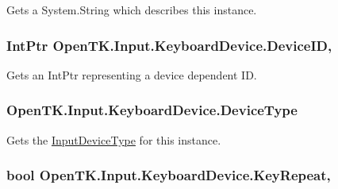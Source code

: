 Gets a System.\-String which describes this instance. 

\hypertarget{class_open_t_k_1_1_input_1_1_keyboard_device_a797379213362e109ae766992cb79b2ee}{
\subsubsection[{Device\-I\-D}]{\setlength{\rightskip}{0pt plus 5cm}Int\-Ptr Open\-T\-K.\-Input.\-Keyboard\-Device.\-Device\-I\-D\hspace{0.3cm}{\ttfamily [get]}, {\ttfamily [set]}}}\label{class_open_t_k_1_1_input_1_1_keyboard_device_a797379213362e109ae766992cb79b2ee}


Gets an Int\-Ptr representing a device dependent I\-D. 

\hypertarget{class_open_t_k_1_1_input_1_1_keyboard_device_a35ba052b764e6b488b6799f839f81848}{
\subsubsection[{Device\-Type}]{ Open\-T\-K.\-Input.\-Keyboard\-Device.\-Device\-Type\hspace{0.3cm}{\ttfamily [get]}}}\label{class_open_t_k_1_1_input_1_1_keyboard_device_a35ba052b764e6b488b6799f839f81848}


Gets the \hyperlink{namespace_open_t_k_1_1_input_a1d147c6256b0adaa5288eec90ed93270}{Input\-Device\-Type} for this instance. 

\hypertarget{class_open_t_k_1_1_input_1_1_keyboard_device_a5a2f02e17370e6ed57f78249cc4b7fde}{
\subsubsection[{Key\-Repeat}]{\setlength{\rightskip}{0pt plus 5cm}bool Open\-T\-K.\-Input.\-Keyboard\-Device.\-Key\-Repeat\hspace{0.3cm}{\ttfamily [get]}, {\ttfamily [set]}}}\label{class_open_t_k_1_1_input_1_1_keyboard_device_a5a2f02e17370e6ed57f78249cc4b7fde}


